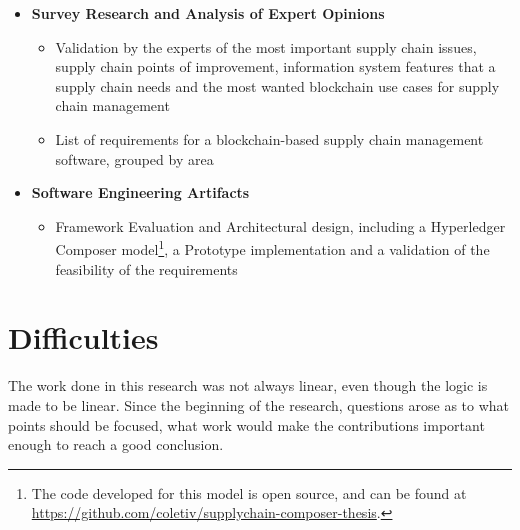 \begin{itemize}
	\item \textbf{Survey Research and Analysis of Expert Opinions}
	\begin{itemize}
		\item Validation by the experts of the most important supply chain issues, supply chain points of improvement, information system features that a supply chain needs and the most wanted blockchain use cases for supply chain management
		\item List of requirements for a blockchain-based supply chain management software, grouped by area %
	\end{itemize}
	\item \textbf{Software Engineering Artifacts}
	\begin{itemize}
		\item Framework Evaluation and Architectural design, including a Hyperledger Composer model\footnote{The code developed for this model is open source, and can be found at \url{https://github.com/coletiv/supplychain-composer-thesis}.}, a Prototype implementation and a validation of the feasibility of the requirements
	\end{itemize}
\end{itemize}



\section{Difficulties}

The work done in this research was not always linear, even though the logic is made to be linear. Since the beginning of the research, questions arose as to what points should be focused, what work would make the contributions important enough to reach a good conclusion. 


